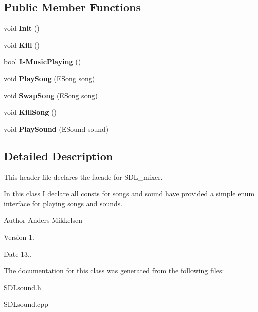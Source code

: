 \subsection*{Public Member Functions}
\begin{DoxyCompactItemize}
\item 
\hypertarget{class_s_d_lsound_a407dc7704779a2bd25895d0f70aaba75}{}void {\bfseries Init} ()\label{class_s_d_lsound_a407dc7704779a2bd25895d0f70aaba75}

\item 
\hypertarget{class_s_d_lsound_a2cbfa4bc2f720c1d7f6782796373582d}{}void {\bfseries Kill} ()\label{class_s_d_lsound_a2cbfa4bc2f720c1d7f6782796373582d}

\item 
\hypertarget{class_s_d_lsound_aa25c6a8e6653fbf92d61577e0367948a}{}bool {\bfseries Is\+Music\+Playing} ()\label{class_s_d_lsound_aa25c6a8e6653fbf92d61577e0367948a}

\item 
\hypertarget{class_s_d_lsound_ad1f30c7cdbcec3ce8e33bb3a8719cbcf}{}void {\bfseries Play\+Song} (E\+Song song)\label{class_s_d_lsound_ad1f30c7cdbcec3ce8e33bb3a8719cbcf}

\item 
\hypertarget{class_s_d_lsound_a29af593912b3be92b465726cabc75a5c}{}void {\bfseries Swap\+Song} (E\+Song song)\label{class_s_d_lsound_a29af593912b3be92b465726cabc75a5c}

\item 
\hypertarget{class_s_d_lsound_a7545264d62aecd3ccda80de15a7879e8}{}void {\bfseries Kill\+Song} ()\label{class_s_d_lsound_a7545264d62aecd3ccda80de15a7879e8}

\item 
\hypertarget{class_s_d_lsound_a623308fa01a7d506d196966b22bea59d}{}void {\bfseries Play\+Sound} (E\+Sound sound)\label{class_s_d_lsound_a623308fa01a7d506d196966b22bea59d}

\end{DoxyCompactItemize}


\subsection{Detailed Description}
This header file declares the facade for S\+D\+L\+\_\+mixer. 

In this class I declare all consts for songs and sound have provided a simple enum interface for playing songs and sounds.

\begin{DoxyAuthor}{Author}
Anders Mikkelsen 
\end{DoxyAuthor}
\begin{DoxyVersion}{Version}
1. 
\end{DoxyVersion}
\begin{DoxyDate}{Date}
13.. 
\end{DoxyDate}


The documentation for this class was generated from the following files\+:\begin{DoxyCompactItemize}
\item 
S\+D\+Lsound.\+h\item 
S\+D\+Lsound.\+cpp\end{DoxyCompactItemize}
